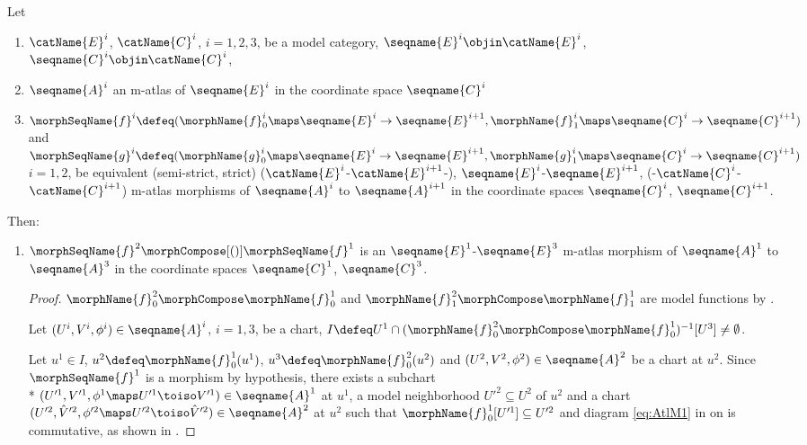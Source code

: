 \documentclass{article}
\begin{document}
\begin{lemma}
\label{lem:M-ATLmorphcomp}
Let
\begin{enumerate}
\item
$\catName{E}^i$, $\catName{C}^i$, $i=1,2,3$, be a model category,
$\seqname{E}^i \objin \catName{E}^i$,
$\seqname{C}^i \objin \catName{C}^i$,
\item
$\seqname{A}^i$ an m-atlas of
$\seqname{E}^i$ in the coordinate space $\seqname{C}^i$
\item
$
  \morphSeqName{f}^i \defeq
  (
    \morphName{f}^i_0 \maps \seqname{E}^i \to \seqname{E}^{i+1},
    \morphName{f}^i_1 \maps \seqname{C}^i \to \seqname{C}^{i+1}
  )
$
and
$
  \morphSeqName{g}^i \defeq
  (
    \morphName{g}^i_0 \maps \seqname{E}^i \to \seqname{E}^{i+1},
    \morphName{g}^i_1 \maps \seqname{C}^i \to \seqname{C}^{i+1}
  )
$
$i=1,2$,
be equivalent (semi-strict, strict)
\nobreaks
  {
    {($\catName{E}^i$-$\catName{E}^{i+1}$-)},
    {$\seqname{E}^i$-$\seqname{E}^{i+1}$},
    {(-$\catName{C}^i$-$\catName{C}^{i+1}$)}
  }
m-atlas morphisms of $\seqname{A}^i$ to $\seqname{A}^{i+1}$ in
the coordinate spaces $\seqname{C}^i$, $\seqname{C}^{i+1}$.
\end{enumerate}

Then:
\begin{enumerate}
\item
\label{M-morphcomp:morphcompmorph}
$\morphSeqName{f}^2 \morphCompose[()] \morphSeqName{f}^1$ is an
$\seqname{E}^1$-$\seqname{E}^3$ m-atlas morphism of $\seqname{A}^1$ to
$\seqname{A}^3$ in the coordinate spaces $\seqname{C}^1$,
$\seqname{C}^3$.

\begin{proof}
$\morphName{f}^2_0 \morphCompose \morphName{f}^1_0$ and
$\morphName{f}^2_1 \morphCompose \morphName{f}^1_1$ are model functions by
.

Let $(U^i, V^i, \phi^i) \in \seqname{A}^i$, $i=1,3$, be a chart,
$
  I \defeq
  U^1 \cap (\morphName{f}^2_0 \morphCompose \morphName{f}^1_0)^{-1}[U^3]
  \neq \emptyset
$.

Let $u^1 \in I$, $u^2 \defeq \morphName{f}^1_0(u^1)$,
$u^3 \defeq \morphName{f}^2_0(u^2)$ and
$(U^2, V^2, \phi^2) \in \seqname{A}^2$ be a chart at $u^2$.
Since $\morphSeqName{f}^1$ is a morphism by hypothesis, there exists a
subchart \\*
\nobreaks
  {{
    $
      (U'^1, V'^1, \phi^1 \maps U'^1 \toiso V'^1)
      \in \seqname{A}^1
    $
  }}
at $u^1$, a model neighborhood $U'^2 \subseteq U^2$ of $u^2$ and a chart
$
  (U'^2 ,\hat{V}'^2, \phi'^2 \maps U'^2 \toiso \hat{V}'^2)
  \in \seqname{A}^2
$
at $u^2$ such that
\nobreaks
  {{
    $\morphName{f}^1_0[U'^1] \subseteq U'^2$
  }}
and diagram \eqref{eq:AtlM1} in  on  is
commutative, as shown in .


\end{proof}
\end{enumerate}
\end{lemma}
\end{document}
